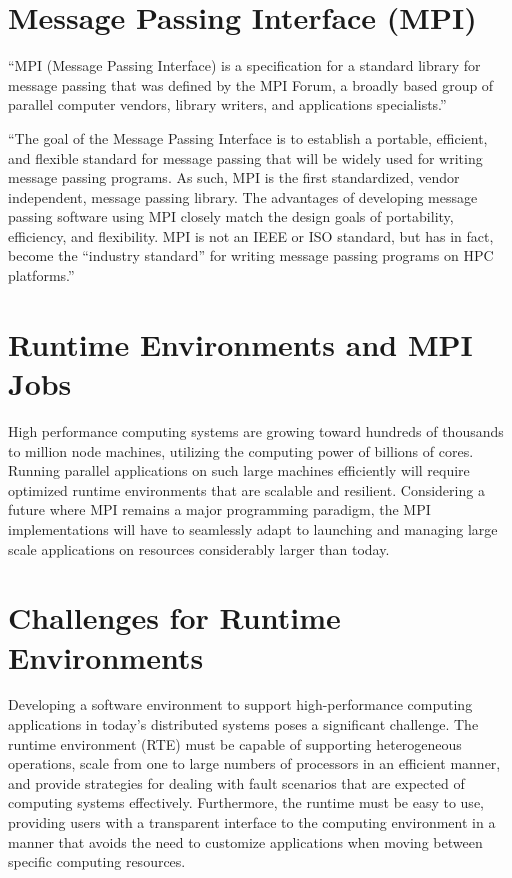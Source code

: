 \section{Message Passing Interface (MPI)}
``MPI (Message Passing Interface) is a specification for a standard library for message passing that was defined by the MPI Forum, a broadly based group of parallel computer vendors, library writers, and applications specialists.''~\cite{gropp1996high}

``The goal of the Message Passing Interface is to establish a portable, efficient, and flexible standard for message passing that will be widely used for writing message passing programs. As such, MPI is the first standardized, vendor independent, message passing library. The advantages of developing message passing software using MPI closely match the design goals of portability, efficiency, and flexibility. MPI is not an IEEE or ISO standard, but has in fact, become the ``industry standard'' for writing message passing programs on HPC platforms.''~\cite{barker2015message}

\section{Runtime Environments and MPI Jobs}
High performance computing systems are growing toward hundreds of thousands to million node machines, utilizing the computing power of billions of cores. Running parallel applications on such large machines efficiently will require optimized runtime environments that are scalable and resilient. Considering a future where MPI remains a major programming paradigm, the MPI implementations will have to seamlessly adapt to launching and managing large scale applications on resources considerably larger than today.~\cite{bosilca2011scalability}

\section{Challenges for Runtime Environments}
Developing a software environment to support high-performance computing applications in today's distributed systems poses a significant challenge. The runtime environment (RTE) must be capable of supporting heterogeneous operations, scale from one to large numbers of processors in an efficient manner, and provide strategies for dealing with fault scenarios that are expected of computing systems effectively. Furthermore, the runtime must be easy to use, providing users with a transparent interface to the computing environment in a manner that avoids the need to customize applications when moving between specific computing resources.~\cite{Castain2008153}


